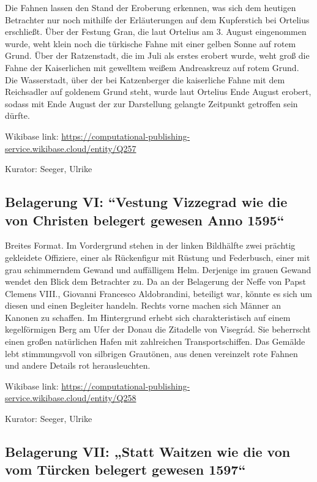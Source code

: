 \documentclass[
  letterpaper,
]{book}
\begin{document}
Die Fahnen lassen den Stand der Eroberung erkennen, was sich dem
heutigen Betrachter nur noch mithilfe der Erläuterungen auf dem
Kupferstich bei Ortelius erschließt. Über der Festung Gran, die laut
Ortelius am 3. August eingenommen wurde, weht klein noch die türkische
Fahne mit einer gelben Sonne auf rotem Grund. Über der Ratzenstadt, die
im Juli als erstes erobert wurde, weht groß die Fahne der Kaiserlichen
mit gewelltem weißem Andreaskreuz auf rotem Grund. Die Wasserstadt, über
der bei Katzenberger die kaiserliche Fahne mit dem Reichsadler auf
goldenem Grund steht, wurde laut Ortelius Ende August erobert, sodass
mit Ende August der zur Darstellung gelangte Zeitpunkt getroffen sein
dürfte.

Wikibase link:
\url{https://computational-publishing-service.wikibase.cloud/entity/Q257}

Kurator: Seeger, Ulrike

\subsection{Belagerung VI: ``Vestung Vizzegrad wie die von Christen
belegert gewesen Anno
1595``}\label{belagerung-vi-vestung-vizzegrad-wie-die-von-christen-belegert-gewesen-anno-1595}

Breites Format. Im Vordergrund stehen in der linken Bildhälfte zwei
prächtig gekleidete Offiziere, einer als Rückenfigur mit Rüstung und
Federbusch, einer mit grau schimmerndem Gewand und auffälligem Helm.
Derjenige im grauen Gewand wendet den Blick dem Betrachter zu. Da an der
Belagerung der Neffe von Papst Clemens VIII., Giovanni Francesco
Aldobrandini, beteiligt war, könnte es sich um diesen und einen
Begleiter handeln. Rechts vorne machen sich Männer an Kanonen zu
schaffen. Im Hintergrund erhebt sich charakteristisch auf einem
kegelförmigen Berg am Ufer der Donau die Zitadelle von Visegrád. Sie
beherrscht einen großen natürlichen Hafen mit zahlreichen
Transportschiffen. Das Gemälde lebt stimmungsvoll von silbrigen
Grautönen, aus denen vereinzelt rote Fahnen und andere Details rot
herausleuchten.

Wikibase link:
\url{https://computational-publishing-service.wikibase.cloud/entity/Q258}

Kurator: Seeger, Ulrike

\subsection{Belagerung VII: „Statt Waitzen wie die von vom Türcken
belegert gewesen
1597``}\label{belagerung-vii-statt-waitzen-wie-die-von-vom-tuxfcrcken-belegert-gewesen-1597}
\end{document}
